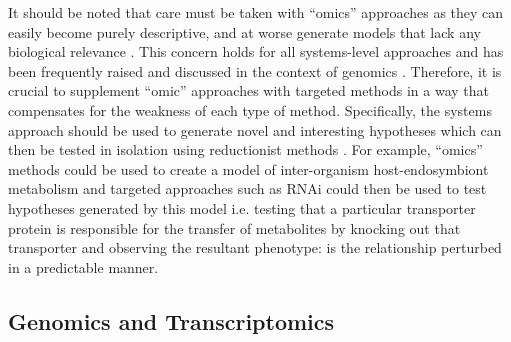 It should be noted that care must be taken with ``omics'' approaches as they can easily become purely descriptive,
and at worse generate models that lack any biological relevance \citep{Fang2011}.  
This concern holds for all systems-level approaches and has been frequently raised and discussed in the context
of genomics \citep{Dougherty2008}.  Therefore, it is crucial to supplement ``omic'' approaches with targeted
methods in a way that compensates for the weakness of each type of method.
Specifically, the systems approach should be used to generate novel and interesting
hypotheses which can then be tested in isolation using reductionist methods \citep{Casadevall2008}.  
For example, ``omics'' methods could be used to create a model of inter-organism host-endosymbiont
metabolism and targeted approaches such as RNAi could then be used to test hypotheses generated
by this model i.e. testing that a particular transporter protein is responsible
for the transfer of metabolites by knocking out that transporter and observing the resultant phenotype: 
is the relationship perturbed in a predictable manner.

\subsection{Genomics and Transcriptomics}

